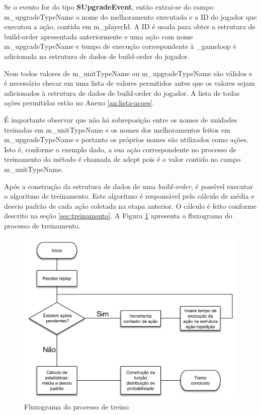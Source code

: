 Se o evento for do tipo \textbf{SUpgradeEvent}, então extrai-se do campo m\_upgradeTypeName o nome do \gls{melhoramento} executado e a ID do jogador que executou a ação, contida em m\_playerId. A ID é usada para obter a estrutura de \gls{build-order} apresentada anteriormente e uma ação com nome m\_upgradeTypeName e tempo de execução correspondente à \_gameloop é adicionada na estrutura de dados de \gls{build-order} do jogador.

Nem todos valores de m\_unitTypeName ou m\_upgradeTypeName são válidos e é necessário checar em uma lista de valores permitidos antes que os valores sejam adicionados à estrutura de dados de \gls{build-order} do jogador. A lista de todas ações permitidas estão no Anexo \ref{an:lista-acoes}.

É importante observar que não há sobreposição entre os nomes de \glspl{unidade} treinadas em m\_unitTypeName e os nomes dos \glspl{melhoramento} feitos em m\_upgradeTypeName e portanto os próprios nomes são utilizados como ações. Isto é, conforme o exemplo dado, a sua ação correspondente no processo de treinamento do método é chamada de \gls{adept} pois é o valor contido no campo m\_unitTypeName.

Após a construção da estrutura de dados de uma \textit{\gls{build-order}}, é possível executar o algoritmo de treinamento. Este algoritmo é responsável pelo cálculo de média e desvio padrão de cada ação coletada na etapa anterior. O cálculo é feito conforme descrito na seção \ref{sec:treinamento}. A Figura \ref{fig:impl-train-fluxogram} apresenta o fluxograma do processo de treinamento.

\begin{figure}[htb]
	\caption{\label{fig:impl-train-fluxogram} Fluxograma do processo de treino}
	\begin{center}
	    \includegraphics[width=\linewidth]{Images/Replay-Action_Training-Fluxogram.pdf}
	\end{center}
\end{figure}


